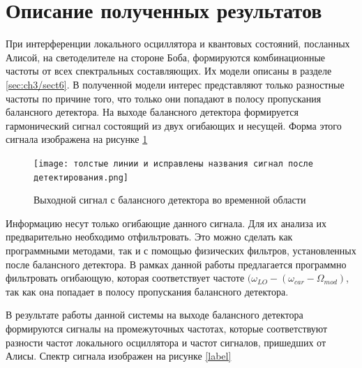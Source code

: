 \section{Описание полученных результатов}\label{sec:ch3/sect7}
При интерференции локального осциллятора и квантовых состояний, посланных Алисой, на светоделителе на стороне Боба, формируются комбинационные частоты от всех спектральных составляющих. Их модели описаны в разделе \ref*{sec:ch3/sect6}.
В полученной модели интерес представляют только разностные частоты по причине того, что только они попадают в полосу пропускания балансного детектора.
На выходе балансного детектора формируется гармонический сигнал состоящий из двух огибающих и несущей. Форма этого сигнала изображена на рисунке \ref*{fig: het true time}
\begin{figure}
    \centering
    \texttt{[image: толстые линии и исправлены названия сигнал после детектирования.png]}
    \caption*{Выходной сигнал с балансного детектора во временной области}
    \label{fig: het true time}
\end{figure}
Информацию несут только огибающие данного сигнала. Для их анализа их предварительно необходимо отфильтровать. Это можно сделать как программными методами, так и с помощью физических фильтров, установленных после балансного детектора.
В рамках данной работы предлагается программно фильтровать огибающую, которая соответствует частоте $(\omega_{LO} -(\omega_{car} - \Omega_{mod})$, так как она попадает в полосу пропускания балансного детектора. 

В результате работы данной системы на выходе балансного детектора формируются сигналы на промежуточных частотах, которые соответствуют разности частот локального осциллятора и частот сигналов, пришедших от Алисы. Спектр сигнала изображен на рисунке \ref*{label}

